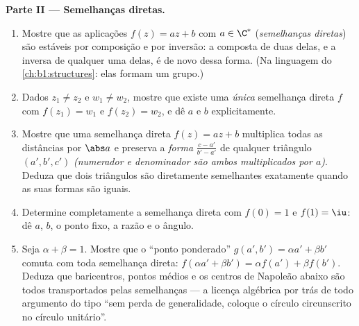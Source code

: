 \begin{problem}
\medskip
\noindent\textbf{Parte II --- Semelhanças diretas.}
\begin{enumerate}
  \item Mostre que as aplicações $f(z) = az + b$ com $a \in \C^*$
        (\emph{semelhanças diretas}) são estáveis por composição
        e por inversão: a composta de duas delas, e a
        inversa de qualquer uma delas, é de novo dessa forma. (Na
        linguagem do \cref{ch:b1:structures}: elas formam um grupo.)
  \item Dados $z_1 \neq z_2$ e $w_1 \neq w_2$, mostre que existe uma
        \emph{única} semelhança direta $f$ com $f(z_1) = w_1$ e
        $f(z_2) = w_2$, e dê $a$ e $b$ explicitamente.
  \item Mostre que uma semelhança direta $f(z) = az + b$ multiplica
        todas as distâncias por $\abs a$ e preserva a \emph{forma}
        $\frac{c - a'}{b' - a'}$ de qualquer triângulo $(a', b', c')$
        \emph{(numerador e denominador são ambos multiplicados por
        $a$)}. Deduza que dois triângulos são diretamente semelhantes
        exatamente quando as suas formas são iguais.
  \item Determine completamente a semelhança direta com $f(0) = 1$
        e $f(1) = \iu$: dê $a$, $b$, o ponto fixo, a razão
        e o ângulo.
  \item Seja $\alpha + \beta = 1$. Mostre que o ``ponto ponderado''
        $g(a', b') = \alpha a' + \beta b'$ comuta com toda
        semelhança direta: $f(\alpha a' + \beta b') = \alpha f(a')
        + \beta f(b')$. Deduza que baricentros, pontos médios e os
        centros de Napoleão abaixo são todos transportados pelas
        semelhanças --- a licença algébrica por trás de todo argumento
        do tipo ``sem perda de generalidade, coloque o círculo
        circunscrito no círculo unitário''.
\end{enumerate}


\end{problem}

